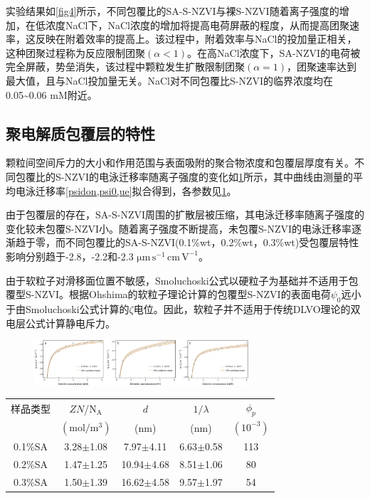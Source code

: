 实验结果如\cref{fig4}所示，不同包覆比的SA-S-NZVI与裸S-NZVI随着离子强度的增加，在低浓度NaCl下，NaCl浓度的增加将提高电荷屏蔽的程度，从而提高团聚速率，这反映在附着效率的提高上。该过程中，附着效率与NaCl的投加量正相关，这种团聚过程称为反应限制团聚$(\alpha<1)$。在高NaCl浓度下，SA-NZVI的电荷被完全屏蔽，势垒消失，该过程中颗粒发生扩散限制团聚$(\alpha=1)$，团聚速率达到最大值，且与NaCl投加量无关。NaCl对不同包覆比S-NZVI的临界浓度均在0.05\textasciitilde0.06 mM附近。

\subsection{聚电解质包覆层的特性}

颗粒间空间斥力的大小和作用范围与表面吸附的聚合物浓度和包覆层厚度有关。不同包覆比的S-NZVI的电泳迁移率随离子强度的变化如\cref{fig5}所示，其中曲线由测量的平均电泳迁移率\cref{psidon,psi0,ue}拟合得到，各参数见\cref{tb1}。

由于包覆层的存在，SA-S-NZVI周围的扩散层被压缩，其电泳迁移率随离子强度的变化较未包覆S-NZVI小。随着离子强度不断提高，未包覆S-NZVI的电泳迁移率逐渐趋于零，而不同包覆比的SA-S-NZVI(0.1\%wt，0.2\%wt，0.3\%wt)受包覆层特性影响分别趋于-2.8，-2.2和-2.3 $\mathrm{\mu m\, s^{-1}\, cm\,V^{-1}} $。

由于软粒子对滑移面位置不敏感\cite{1992Electrophoretic}，Smoluchoski公式以硬粒子为基础并不适用于包覆型S-NZVI。根据Ohshima的软粒子理论计算的包覆型S-NZVI的表面电荷$\psi_0$远小于由Smoluchoski公式计算的$\zeta$电位。因此，软粒子并不适用于传统DLVO理论的双电层公式计算静电斥力。

\begin{figure}[h]
    \centering
    \includegraphics[width=8cm]{figs/fig5.pdf}
    \label{fig5}
\end{figure}

\begin{table}
    \centering
    \label{tb1}
    \begin{tabular}{@{}ccccc@{}}
        \toprule
         样品类型 & $ZN$/$\mathrm{N_A}$& $d$ & $1/\lambda$ &$\phi_p$\\
           &$(\mathrm{mol/m^3})$&(nm)&(nm)& $(10^{-3})$ \\
        \midrule
        0.1\%SA & 3.28$\pm$1.08 & 7.97$\pm$4.11 & 6.63$\pm$0.58 & 113\\
        0.2\%SA & 1.47$\pm$1.25 & 10.94$\pm$4.68 & 8.51$\pm$1.06 & 80\\
        0.3\%SA & 1.50$\pm$1.39 & 16.62$\pm$4.58 & 9.57$\pm$1.97 & 54\\
        \bottomrule
    \end{tabular}
\end{table}


